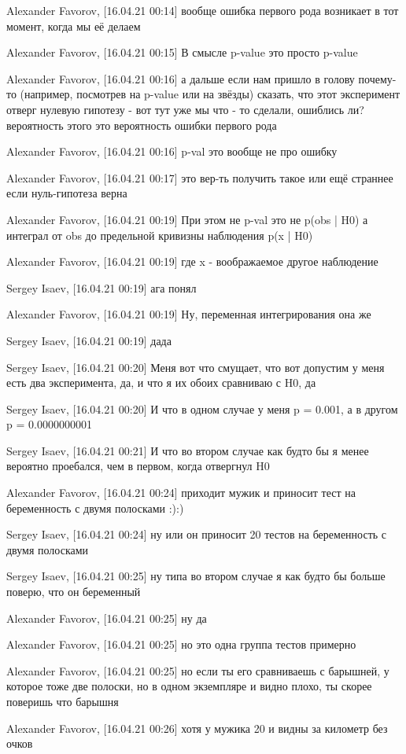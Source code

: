 \documentclass{book}
\begin{document}
Alexander Favorov, [16.04.21 00:14]
вообще ошибка первого рода возникает в тот момент, когда мы её делаем

Alexander Favorov, [16.04.21 00:15]
В смысле p-value это просто p-value

Alexander Favorov, [16.04.21 00:16]
а дальше если нам пришло в голову почему-то (например, посмотрев на p-value или на звёзды) сказать, что этот эксперимент отверг нулевую гипотезу - вот тут уже мы что - то сделали, ошиблись ли? вероятность этого это вероятность ошибки первого рода

Alexander Favorov, [16.04.21 00:16]
p-val это вообще не про ошибку

Alexander Favorov, [16.04.21 00:17]
это вер-ть получить такое или ещё страннее если нуль-гипотеза верна

Alexander Favorov, [16.04.21 00:19]
При этом не p-val это не  p(obs | H0) а интеграл от obs до предельной кривизны наблюдения  p(x | H0)

Alexander Favorov, [16.04.21 00:19]
где x - воображаемое другое наблюдение

Sergey Isaev, [16.04.21 00:19]
ага понял

Alexander Favorov, [16.04.21 00:19]
Ну, переменная интегрирования она же

Sergey Isaev, [16.04.21 00:19]
дада

Sergey Isaev, [16.04.21 00:20]
Меня вот что смущает, что вот допустим у меня есть два эксперимента, да, и что я их обоих сравниваю с H0, да

Sergey Isaev, [16.04.21 00:20]
И что в одном случае у меня p = 0.001, а в другом p = 0.0000000001

Sergey Isaev, [16.04.21 00:21]
И что во втором случае как будто бы я менее вероятно проебался, чем в первом, когда отвергнул H0

Alexander Favorov, [16.04.21 00:24]
приходит мужик и приносит тест на беременность с двумя полосками :):)

Sergey Isaev, [16.04.21 00:24]
ну или он приносит 20 тестов на беременность с двумя полосками

Sergey Isaev, [16.04.21 00:25]
ну типа во втором случае я как будто бы больше поверю, что он беременный

Alexander Favorov, [16.04.21 00:25]
ну да

Alexander Favorov, [16.04.21 00:25]
но это одна группа тестов примерно

Alexander Favorov, [16.04.21 00:25]
но если ты его сравниваешь с барышней, у которое тоже две полоски, но в одном экземпляре и видно плохо, ты скорее поверишь что барышня

Alexander Favorov, [16.04.21 00:26]
хотя у мужика 20 и видны за километр без очков
\end{document}
